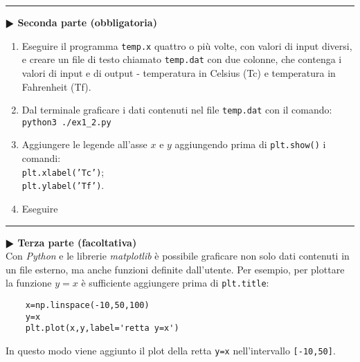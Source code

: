 \documentclass[11pt]{article}
\begin{document}
\hrule
\vspace{2mm}
\textbf{$\RHD$ Seconda parte (obbligatoria)} 
%
\begin{enumerate}
\item Eseguire il programma \texttt{temp.x} quattro o pi\`u volte, con valori di input diversi, e creare un file di testo chiamato \texttt{temp.dat} con due colonne,
  che contenga i valori di input e di output - temperatura in Celsius (Tc) e
  temperatura in Fahrenheit (Tf).
\item Dal terminale graficare i dati contenuti nel file \texttt{temp.dat} con il comando:\\
\texttt{python3 ./ex1\_2.py}
\item Aggiungere le legende all'asse $x$ e $y$ aggiungendo prima di \texttt{plt.show()} i comandi:
\\
\texttt{plt.xlabel('Tc')};
\\
\texttt{plt.ylabel('Tf')}.
 \item Eseguire 
 \end{enumerate}


\hrule
\vspace{2mm}\textbf{$\RHD$ Terza parte (facoltativa)\\}
%
Con {\it Python} e le librerie {\it matplotlib} \`e possibile graficare non solo dati contenuti in un file esterno, ma anche funzioni definite dall'utente. Per esempio,
per plottare la funzione $y=x$ \`e sufficiente aggiungere prima di \texttt{plt.title}: 
\begin{mdframed}[backgroundcolor=gray!10]
  \begin{verbatim}
    x=np.linspace(-10,50,100)
    y=x
    plt.plot(x,y,label='retta y=x')
\end{verbatim}
\end{mdframed}
In questo modo viene aggiunto il plot della retta \texttt{y=x} nell'intervallo \texttt{[-10,50]}. 

\end{document}
